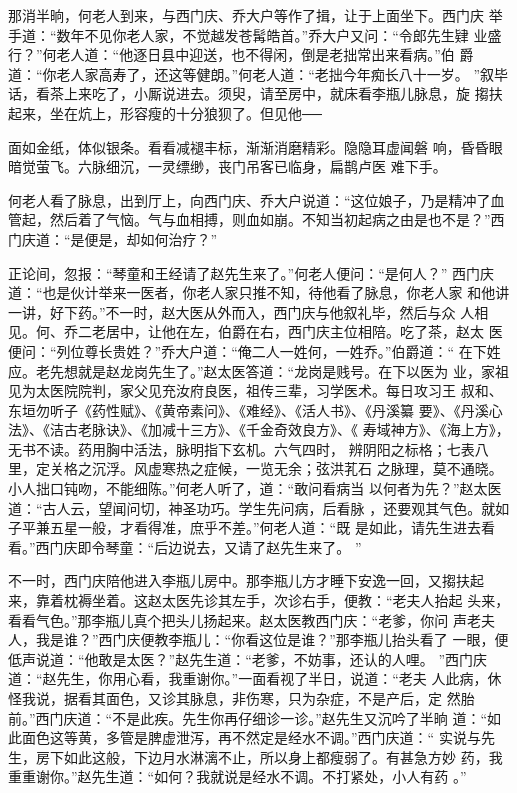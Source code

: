 那消半晌，何老人到来，与西门庆、乔大户等作了揖，让于上面坐下。西门庆
举手道：“数年不见你老人家，不觉越发苍髯皓首。”乔大户又问：“令郎先生肄
业盛行？”何老人道：“他逐日县中迎送，也不得闲，倒是老拙常出来看病。”伯
爵道：“你老人家高寿了，还这等健朗。”何老人道：“老拙今年痴长八十一岁。
”叙毕话，看茶上来吃了，小厮说进去。须臾，请至房中，就床看李瓶儿脉息，旋
搊扶起来，坐在炕上，形容瘦的十分狼狈了。但见他──

面如金纸，体似银条。看看减褪丰标，渐渐消磨精彩。隐隐耳虚闻磐
响，昏昏眼暗觉萤飞。六脉细沉，一灵缥缈，丧门吊客已临身，扁鹊卢医
难下手。

何老人看了脉息，出到厅上，向西门庆、乔大户说道：“这位娘子，乃是精冲了血
管起，然后着了气恼。气与血相搏，则血如崩。不知当初起病之由是也不是？”西
门庆道：“是便是，却如何治疗？”

正论间，忽报：“琴童和王经请了赵先生来了。”何老人便问：“是何人？”
西门庆道：“也是伙计举来一医者，你老人家只推不知，待他看了脉息，你老人家
和他讲一讲，好下药。”不一时，赵大医从外而入，西门庆与他叙礼毕，然后与众
人相见。何、乔二老居中，让他在左，伯爵在右，西门庆主位相陪。吃了茶，赵太
医便问：“列位尊长贵姓？”乔大户道：“俺二人一姓何，一姓乔。”伯爵道：“
在下姓应。老先想就是赵龙岗先生了。”赵太医答道：“龙岗是贱号。在下以医为
业，家祖见为太医院院判，家父见充汝府良医，祖传三辈，习学医术。每日攻习王
叔和、东垣勿听子《药性赋》、《黄帝素问》、《难经》、《活人书》、《丹溪纂
要》、《丹溪心法》、《洁古老脉诀》、《加减十三方》、《千金奇效良方》、《
寿域神方》、《海上方》，无书不读。药用胸中活法，脉明指下玄机。六气四时，
辨阴阳之标格；七表八里，定关格之沉浮。风虚寒热之症候，一览无余；弦洪芤石
之脉理，莫不通晓。小人拙口钝吻，不能细陈。”何老人听了，道：“敢问看病当
以何者为先？”赵太医道：“古人云，望闻问切，神圣功巧。学生先问病，后看脉
，还要观其气色。就如子平兼五星一般，才看得准，庶乎不差。”何老人道：“既
是如此，请先生进去看看。”西门庆即令琴童：“后边说去，又请了赵先生来了。
”

不一时，西门庆陪他进入李瓶儿房中。那李瓶儿方才睡下安逸一回，又搊扶起
来，靠着枕褥坐着。这赵太医先诊其左手，次诊右手，便教：“老夫人抬起
头来，看看气色。”那李瓶儿真个把头儿扬起来。赵太医教西门庆：“老爹，你问
声老夫人，我是谁？”西门庆便教李瓶儿：“你看这位是谁？”那李瓶儿抬头看了
一眼，便低声说道：“他敢是太医？”赵先生道：“老爹，不妨事，还认的人哩。
”西门庆道：“赵先生，你用心看，我重谢你。”一面看视了半日，说道：“老夫
人此病，休怪我说，据看其面色，又诊其脉息，非伤寒，只为杂症，不是产后，定
然胎前。”西门庆道：“不是此疾。先生你再仔细诊一诊。”赵先生又沉吟了半晌
道：“如此面色这等黄，多管是脾虚泄泻，再不然定是经水不调。”西门庆道：“
实说与先生，房下如此这般，下边月水淋漓不止，所以身上都瘦弱了。有甚急方妙
药，我重重谢你。”赵先生道：“如何？我就说是经水不调。不打紧处，小人有药
。”

